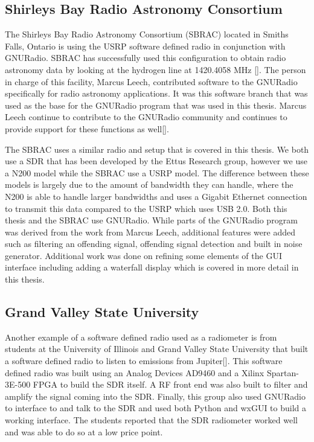 \subsection{Shirleys Bay Radio Astronomy Consortium}
The Shirleys Bay Radio Astronomy Consortium (SBRAC) located in Smiths Falls, Ontario is using the USRP software defined radio in conjunction with GNURadio.  SBRAC has successfully used this configuration to obtain radio astronomy data by looking at the hydrogen line at 1420.4058 MHz [\cite{Leech2007}].  The person in charge of this facility, Marcus Leech, contributed software to the GNURadio specifically for radio astronomy applications.  It was this software branch that was used as the base for the GNURadio program that was used in this thesis.  Marcus Leech continue to contribute to the GNURadio community and continues to provide support for these functions as well[\cite{Leech}].

The SBRAC uses a similar radio and setup that is covered in this thesis.  We both use a SDR that has been developed by the Ettus Research group, however we use a N200 model while the SBRAC use a USRP model.  The difference between these models is largely due to the amount of bandwidth they can handle, where the N200 is able to handle larger bandwidths and uses a Gigabit Ethernet connection to transmit this data compared to the USRP which uses USB 2.0.  Both this thesis and the SBRAC use GNURadio.  While parts of the GNURadio program was derived from the work from Marcus Leech, additional features were added such as filtering an offending signal, offending signal detection and built in noise generator.  Additional work was done on refining some elements of the GUI interface including adding a waterfall display which is covered in more detail in this thesis.

\subsection{Grand Valley State University}
Another example of a software defined radio used as a radiometer is from students at the University of Illinois and Grand Valley State University that built a software defined radio to listen to emissions from Jupiter[\cite{Behnke}].  This software defined radio was built using an Analog Devices AD9460 and a Xilinx Spartan-3E-500 FPGA to build the SDR itself.  A RF front end was also built to filter and amplify the signal coming into the SDR.  Finally, this group also used GNURadio to interface to and talk to the SDR and used both Python and wxGUI to build a working interface.  The students reported that the SDR radiometer worked well and was able to do so at a low price point.

